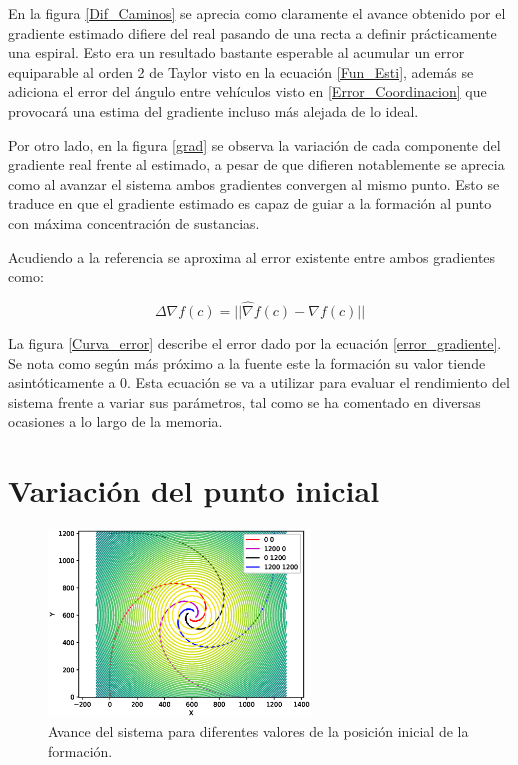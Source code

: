 En la figura \ref{Dif_Caminos} se aprecia como claramente el avance obtenido por el gradiente estimado difiere del real pasando de una recta a definir prácticamente una espiral. Esto era un resultado bastante esperable al acumular un error equiparable al orden 2 de Taylor visto en la ecuación \ref{Fun_Esti}, además se adiciona el error del ángulo entre vehículos visto en \ref{Error_Coordinacion} que provocará una estima del gradiente incluso más alejada de lo ideal. 

Por otro lado, en la figura \ref{grad} se observa la variación de cada componente del  gradiente real frente al estimado, a pesar de que difieren notablemente se aprecia como al avanzar el sistema ambos gradientes convergen al mismo punto. Esto se traduce en que el gradiente estimado es capaz de guiar a la formación al punto con máxima concentración de sustancias.

Acudiendo a la referencia \cite{Estimacion_Gradiente} se aproxima al error existente entre ambos gradientes como:

\begin{equation} \label{error_gradiente}
	\Delta{\nabla{f\left(c\right)}}=||\hat{\nabla}f\left(c\right)-\nabla{f}\left(c\right)||
\end{equation}

La figura \ref{Curva_error} describe el error dado por la ecuación \ref{error_gradiente}. Se nota como según más próximo a la fuente este la formación su valor tiende asintóticamente a 0. Esta ecuación se va a utilizar para evaluar el rendimiento del sistema frente a variar sus parámetros, tal como se ha comentado en diversas ocasiones a lo largo de la memoria.

\section{Variación del punto inicial}
\begin{figure}[H]
\centering
\includegraphics[width=0.62\textwidth]{figures/4_puntos_observar_forma/Figure_1.eps}
\caption{Avance del sistema para diferentes valores de la posición inicial de la formación.} \label{Avance_Posicion}
\end{figure}


